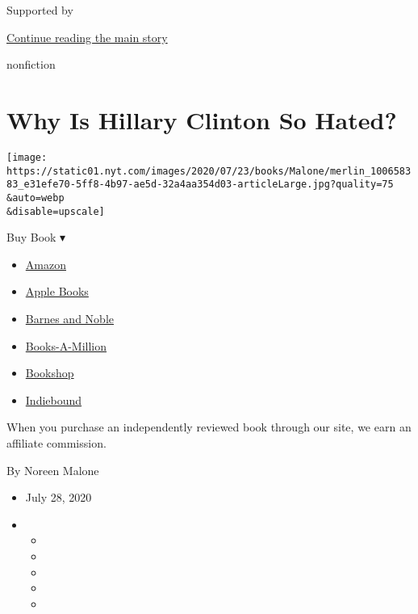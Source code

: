 Supported by

\protect\hyperlink{after-sponsor}{Continue reading the main story}

nonfiction

\hypertarget{why-is-hillary-clinton-so-hated}{%
\section{Why Is Hillary Clinton So
Hated?}\label{why-is-hillary-clinton-so-hated}}

\texttt{[image: https://static01.nyt.com/images/2020/07/23/books/Malone/merlin\_100658383\_e31efe70-5ff8-4b97-ae5d-32a4aa354d03-articleLarge.jpg?quality=75\\\&auto=webp\\\&disable=upscale]}

Buy Book ▾

\begin{itemize}
\tightlist
\item
  \href{https://www.amazon.com/gp/search?index=books\&tag=NYTBSREV-20\&field-keywords=The+Hunting+of+Hillary+Michael+D\%27Antonio}{Amazon}
\item
  \href{https://du-gae-books-dot-nyt-du-prd.appspot.com/buy?title=The+Hunting+of+Hillary\&author=Michael+D\%27Antonio}{Apple
  Books}
\item
  \href{https://www.anrdoezrs.net/click-7990613-11819508?url=https\%3A\%2F\%2Fwww.barnesandnoble.com\%2Fw\%2F\%3Fean\%3D9731250154606}{Barnes
  and Noble}
\item
  \href{https://www.anrdoezrs.net/click-7990613-35140?url=https\%3A\%2F\%2Fwww.booksamillion.com\%2Fp\%2FThe\%2BHunting\%2Bof\%2BHillary\%2FMichael\%2BD\%2527Antonio\%2F9731250154606}{Books-A-Million}
\item
  \href{https://bookshop.org/a/3546/9731250154606}{Bookshop}
\item
  \href{https://www.indiebound.org/book/9731250154606?aff=NYT}{Indiebound}
\end{itemize}

When you purchase an independently reviewed book through our site, we
earn an affiliate commission.

By Noreen Malone

\begin{itemize}
\item
  July 28, 2020
\item
  \begin{itemize}
  \item
  \item
  \item
  \item
  \item
  \end{itemize}
\end{itemize}

